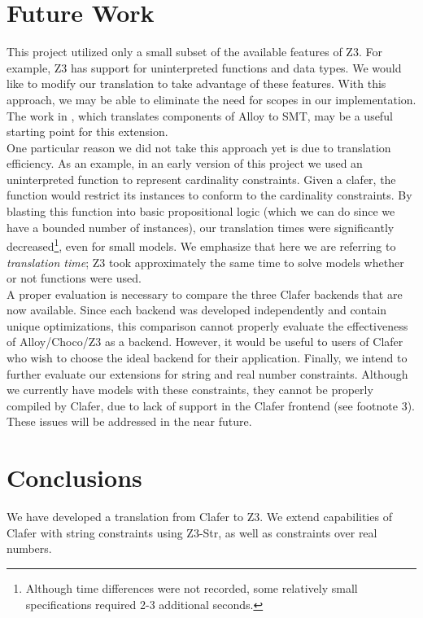 \documentclass{easychair}
\begin{document}
\section{Future Work}
This project utilized only a small subset of the available features of Z3. For example, Z3 has support for uninterpreted functions and data types. We would like to modify our translation to take advantage of these features. With this approach, we may be able to eliminate the need for scopes in our implementation. The work in \cite{Mana}, which translates components of Alloy to SMT, may be a useful starting point for this extension.\\
\indent One particular reason we did not take this approach yet is due to translation efficiency. As an example, in an early version of this project we used an uninterpreted function to represent cardinality constraints. Given a clafer, the function would restrict its instances to conform to the cardinality constraints. By blasting this function into basic propositional logic (which we can do since we have a bounded number of instances), our translation times were significantly decreased\footnote{Although time differences were not recorded, some relatively small specifications required 2-3 additional seconds.}, even for small models. We emphasize that here we are referring to \textit{translation time}; Z3 took approximately the same time to solve models whether or not functions were used.\\
\indent A proper evaluation is necessary to compare the three Clafer backends that are now available. Since each backend was developed independently and contain unique optimizations, this comparison cannot properly evaluate the effectiveness of Alloy/Choco/Z3 as a backend. However, it would be useful to users of Clafer who wish to choose the ideal backend for their application. 
\indent Finally, we intend to further evaluate our extensions for string and real number constraints. Although we currently have models with these constraints, they cannot be properly compiled by Clafer, due to lack of support in the Clafer frontend (see footnote 3). These issues will be addressed in the near future. 

\section{Conclusions}
We have developed a translation from Clafer to Z3. We extend capabilities of Clafer with string constraints using Z3-Str, as well as constraints over real numbers.





\end{document}
